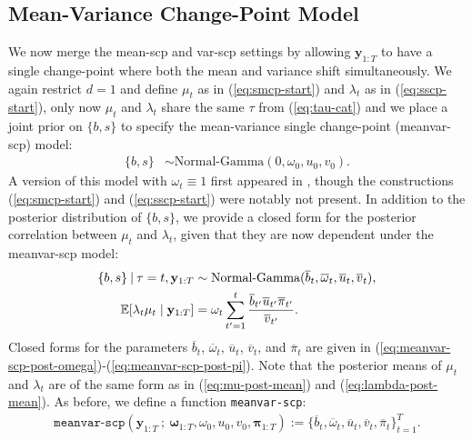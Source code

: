 \subsection{Mean-Variance Change-Point Model}
\label{sec:smscp}

We now merge the mean-scp and var-scp settings by allowing $\mathbf{y}_{1:T}$ to have a single change-point where both the mean and variance shift simultaneously. We again restrict $d=1$ and define $\mu_t$ as in (\ref{eq:smcp-start}) and $\lambda_t$ as in (\ref{eq:sscp-start}), only now $\mu_t$ and $\lambda_t$ share the same $\tau$ from (\ref{eq:tau-cat}) and we place a joint prior on $\{b,s\}$ to specify the mean-variance single change-point (meanvar-scp) model:
\begin{align}
    \{b,s\} &\sim \text{Normal-Gamma}(0,\omega_0, u_0, v_0).
    \label{eq:smscp-end}
\end{align}
A version of this model with $\omega_t\equiv 1$ first appeared in \cite{Smith75}, though the constructions (\ref{eq:smcp-start}) and (\ref{eq:sscp-start}) were notably not present. In addition to the posterior distribution of $\{b,s\}$, we provide a closed form for the posterior correlation between $\mu_t$ and $\lambda_t$, given that they are now dependent under the meanvar-scp model:
\begin{align}
    \{b,s\} \:|\: \tau = t, \mathbf{y}_{1:T} &\sim \text{Normal-Gamma}(\overline{b}_t, \overline{\omega}_t, \overline{u}_t, \overline{v}_t), \label{eq:bs-smscp} \\
   \mathbb{E}[\lambda_t\mu_t\;|\; \mathbf{y}_{1:T}] &= \omega_t\sum_{t'=1}^t \frac{\overline{b}_{t'}\overline{u}_{t'}\overline{\pi}_{t'} }{\overline{v}_{t'}}. \label{eq:mu-lambda-post-mean}
\end{align}
Closed forms for the parameters $\overline{b}_t$, $\overline{\omega}_t$, $\overline{u}_{t}$, $\overline{v}_{t}$, and $\overline{\pi}_t$ are given in (\ref{eq:meanvar-scp-post-omega})-(\ref{eq:meanvar-scp-post-pi}). Note that the posterior means of $\mu_t$ and $\lambda_t$ are of the same form as in (\ref{eq:mu-post-mean}) and (\ref{eq:lambda-post-mean}). As before, we define a function \texttt{meanvar-scp}: 
\begin{align}\label{eq:meanvar-scp-fn}
    \texttt{meanvar-scp}\left(\mathbf{y}_{1:T} \:;\: \boldsymbol{\omega}_{1:T}, \omega_0, u_0, v_0, \boldsymbol{\pi}_{1:T}\right) := \{\overline{b}_t, \overline{\omega}_t, \overline{u}_t, \overline{v}_t, \overline{\pi}_t\}_{t=1}^T.
\end{align}

